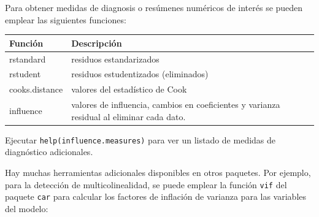 \documentclass[]{book}
\begin{document}
Para obtener medidas de diagnosis o resúmenes numéricos de interés se pueden emplear
las siguientes funciones:

\begin{longtable}[]{@{}ll@{}}
\toprule
\begin{minipage}[b]{0.10\columnwidth}\raggedright
Función\strut
\end{minipage} & \begin{minipage}[b]{0.85\columnwidth}\raggedright
Descripción\strut
\end{minipage}\tabularnewline
\midrule
\endhead
\begin{minipage}[t]{0.10\columnwidth}\raggedright
rstandard\strut
\end{minipage} & \begin{minipage}[t]{0.85\columnwidth}\raggedright
residuos estandarizados\strut
\end{minipage}\tabularnewline
\begin{minipage}[t]{0.10\columnwidth}\raggedright
rstudent\strut
\end{minipage} & \begin{minipage}[t]{0.85\columnwidth}\raggedright
residuos estudentizados (eliminados)\strut
\end{minipage}\tabularnewline
\begin{minipage}[t]{0.10\columnwidth}\raggedright
cooks.distance\strut
\end{minipage} & \begin{minipage}[t]{0.85\columnwidth}\raggedright
valores del estadístico de Cook\strut
\end{minipage}\tabularnewline
\begin{minipage}[t]{0.10\columnwidth}\raggedright
influence\strut
\end{minipage} & \begin{minipage}[t]{0.85\columnwidth}\raggedright
valores de influencia, cambios en coeficientes y varianza residual al eliminar cada dato.\strut
\end{minipage}\tabularnewline
\bottomrule
\end{longtable}

Ejecutar \texttt{help(influence.measures)} para ver un listado de medidas de diagnóstico adicionales.

Hay muchas herramientas adicionales disponibles en otros paquetes.
Por ejemplo, para la detección de multicolinealidad, se puede emplear la función
\texttt{vif} del paquete \texttt{car} para calcular los factores de inflación de varianza para
las variables del modelo:
\end{document}
